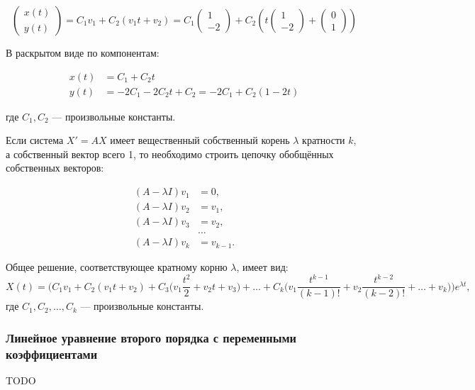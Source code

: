 \begin{equation*}
    \begin{pmatrix} x(t) \\ y(t) \end{pmatrix} =
    C_1 v_1 + C_2 (v_1 t + v_2)
    = C_1 \begin{pmatrix} 1 \\ -2 \end{pmatrix} +
    C_2 \left( t \begin{pmatrix} 1 \\ -2 \end{pmatrix} + \begin{pmatrix} 0 \\ 1 \end{pmatrix} \right)
\end{equation*}

В раскрытом виде по компонентам:

\begin{align*}
    x(t) &= C_1 + C_2 t \\
    y(t) &= -2 C_1 - 2 C_2 t + C_2 = -2 C_1 + C_2 (1 - 2 t)
\end{align*}

где \(C_1, C_2\) — произвольные константы.

\Note
Если система $X' = A X$ имеет вещественный собственный корень \(\lambda\) кратности \(k\), а собственный вектор всего 1, то необходимо строить цепочку обобщённых собственных векторов:

\begin{align*}
(A - \lambda I)v_1 &= 0, \\
(A - \lambda I)v_2 &= v_1, \\
(A - \lambda I)v_3 &= v_2, \\
&\dots \\
(A - \lambda I)v_k &= v_{k-1}.
\end{align*}

Общее решение, соответствующее кратному корню \(\lambda\), имеет вид:
\begin{equation*}
    X(t) = \Big(C_1 v_1 + C_2 (v_1 t + v_2) + C_3 \big(v_1 \frac{t^2}{2} + v_2 t + v_3\big) + \dots + C_k \big(v_1 \frac{t^{k-1}}{(k-1)!} + v_2 \frac{t^{k-2}}{(k-2)!} + \dots + v_k\big)\Big) e^{\lambda t},
\end{equation*}
где \(C_1, C_2, \dots, C_k\) — произвольные константы.

\subsubsection{Линейное уравнение второго порядка с переменными коэффициентами}

TODO
